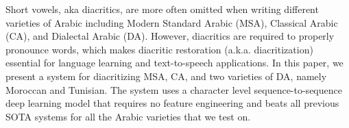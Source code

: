 Short vowels, aka diacritics, are more often omitted when writing different varieties of Arabic including Modern Standard Arabic (MSA), Classical Arabic (CA), and Dialectal Arabic (DA).  However, diacritics are required to properly pronounce words, which makes diacritic restoration (a.k.a. diacritization) essential for language learning and  text-to-speech applications. In this paper, we present a system for diacritizing MSA, CA, and two varieties of DA, namely Moroccan and Tunisian.  The system uses a character level sequence-to-sequence deep learning model that requires no feature engineering and beats all previous SOTA systems for all the Arabic varieties that we test on.